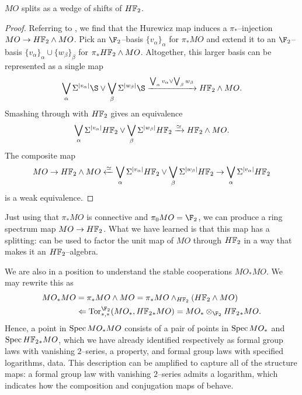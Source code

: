 \begin{lemma}\label{MOSplitsIntoHF2s}
\(MO\) splits as a wedge of shifts of \(\HFtwo\).
\end{lemma}
\begin{proof}
Referring to , we find that the Hurewicz map induces a \(\pi_*\)--injection \(MO \to \HFtwo \sm MO\).  Pick an \(\F_2\)--basis \(\{v_\alpha\}_\alpha\) for \(\pi_* MO\) and extend it to an \(\F_2\)--basis \(\{v_\alpha\}_\alpha \cup \{w_\beta\}_\beta\) for \(\pi_* \HFtwo \sm MO\).  Altogether, this larger basis can be represented as a single map \[\bigvee_\alpha \Susp^{|v_\alpha|} \S \vee \bigvee_\beta \Susp^{|w_\beta|} \S \xrightarrow{\bigvee_\alpha v_\alpha \vee \bigvee_\beta w_\beta} \HFtwo \sm MO.\]  Smashing through with \(\HFtwo\) gives an equivalence \[\bigvee_\alpha \Susp^{|v_\alpha|} \HFtwo \vee \bigvee_\beta \Susp^{|w_\beta|} \HFtwo \xrightarrow\simeq \HFtwo \sm MO.\]  The composite map \[MO \to \HFtwo \sm MO \xleftarrow\simeq \bigvee_\alpha \Susp^{|v_\alpha|} \HFtwo \vee \bigvee_\beta \Susp^{|w_\beta|} \HFtwo \to \bigvee_\alpha \Susp^{|v_\alpha|} \HFtwo\] is a weak equivalence.
\end{proof}

\begin{remark}
Just using that \(\pi_* MO\) is connective and \(\pi_0 MO = \F_2\), we can produce a ring spectrum map \(MO \to \HFtwo\).  What we have learned is that this map has a splitting:  can be used to factor the unit map of \(MO\) through \(\HFtwo\) in a way that makes it an \(\HFtwo\)--algebra.
\end{remark}

\begin{remark}
We are also in a position to understand the stable cooperations \(MO_* MO\).  We may rewrite this as
\begin{align*}
MO_* MO & = \pi_* MO \sm MO = \pi_* MO \sm_{\HFtwo} (\HFtwo \sm MO) \\
& \Leftarrow \Tor^{\F_2}_{*, *}(MO_*, \HFtwo_* MO) = MO_* \otimes_{\F_2} \HFtwo_* MO.
\end{align*}
Hence, a point in \(\operatorname{Spec} MO_* MO\) consists of a pair of points in \(\operatorname{Spec} MO_*\) and \(\Spec \HFtwo_* MO\), which we have already identified respectively as formal group laws with vanishing \(2\)--series, a property, and formal group laws with specified logarithms, data.  This description can be amplified to capture all of the structure maps: a formal group law with vanishing \(2\)--series admits a logarithm, which indicates how the composition and conjugation maps of  behave.
\end{remark}




